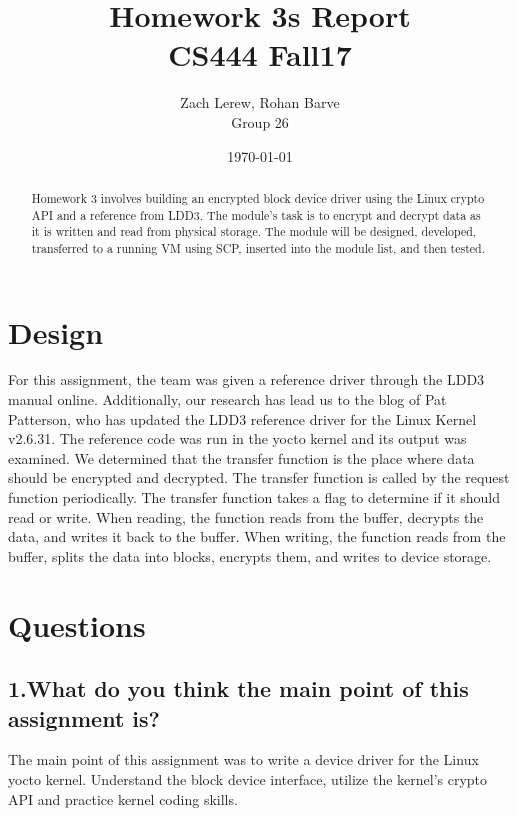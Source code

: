\documentclass[onecolumn, draftclsnofoot,10pt, compsoc]{IEEEtran}
\title{Homework 3s Report\\\large CS444 Fall17}
\author{Zach Lerew, Rohan Barve\\\large Group 26}
\date{\today}
\begin{document}
  \maketitle

	\begin{titlingpage}
		\begin{abstract}
			\noindent Homework 3 involves building an encrypted block device driver using the Linux crypto API and a reference from LDD3.
      The module's task is to encrypt and decrypt data as it is written and read from physical storage.
      The module will be designed, developed, transferred to a running VM using SCP, inserted into the module list, and then tested.
		\end{abstract}
	\end{titlingpage}

  \clearpage
  \singlespace

	\section*{Design}
  For this assignment, the team was given a reference driver through the LDD3 manual online.
  Additionally, our research has lead us to the blog of Pat Patterson, who has updated the LDD3 reference driver for the Linux Kernel v2.6.31. \cite{pat}
  The reference code was run in the yocto kernel and its output was examined.
  We determined that the transfer function is the place where data should be encrypted and decrypted. The transfer function is called by the request function periodically.
  The transfer function takes a flag to determine if it should read or write.
  When reading, the function reads from the buffer, decrypts the data, and writes it back to the buffer.
  When writing, the function reads from the buffer, splits the data into blocks, encrypts them, and writes to device storage.

	\section*{Questions}
	\subsection*{1.What do you think the main point of this assignment is?}
	The main point of this assignment was to write a device driver for the Linux yocto kernel.
	Understand the block device interface, utilize the kernel's crypto API and practice kernel
	coding skills.
\end{document}
